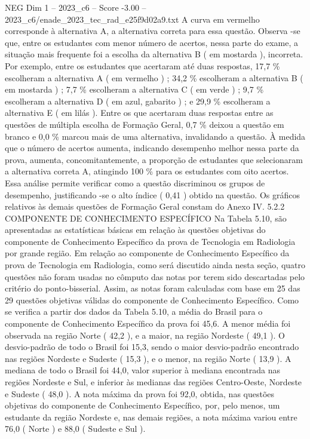 \begin{textsample}{NEG Dim 1 – 2023\_c6 – Score -3.00 – 2023\_c6/enade\_2023\_tec\_rad\_e25f9d02a9.txt}
A curva em vermelho corresponde à alternativa A, a alternativa correta para essa questão.
Observa -se que, entre os estudantes com menor número de acertos, nessa parte do exame, a situação mais frequente foi a escolha da alternativa B ( em mostarda ), incorreta.
Por exemplo, entre os estudantes que acertaram até duas respostas, 17,7 \% escolheram a alternativa A ( em vermelho ) ; 34,2 \% escolheram a alternativa B ( em mostarda ) ; 7,7 \% escolheram a alternativa C ( em verde ) ; 9,7 \% escolheram a alternativa D ( em azul, gabarito ) ; e 29,9 \% escolheram a alternativa E ( em lilás ).
Entre os que acertaram duas respostas entre as questões de múltipla escolha de Formação Geral, 0,7 \% deixou a questão em branco e 0,0 \% marcou mais de uma alternativa, invalidando a questão.
À medida que o número de acertos aumenta, indicando desempenho melhor nessa parte da prova, aumenta, concomitantemente, a proporção de estudantes que selecionaram a alternativa correta A, atingindo 100 \% para os estudantes com oito acertos.
Essa análise permite verificar como a questão discriminou os grupos de desempenho, justificando -se o alto índice ( 0,41 ) obtido na questão.
Os gráficos relativos às demais questões de Formação Geral constam do Anexo IV. 5.2.2 COMPONENTE DE CONHECIMENTO ESPECÍFICO Na Tabela 5.10, são apresentadas as estatísticas básicas em relação às questões objetivas do componente de Conhecimento Específico da prova de Tecnologia em Radiologia por grande região.
Em relação ao componente de Conhecimento Específico da prova de Tecnologia em Radiologia, como será discutido ainda nesta seção, quatro questões não foram usadas no cômputo das notas por terem sido descartadas pelo critério do ponto-bisserial.
Assim, as notas foram calculadas com base em 25 das 29 questões objetivas válidas do componente de Conhecimento Específico.
Como se verifica a partir dos dados da Tabela 5.10, a média do Brasil para o componente de Conhecimento Específico da prova foi 45,6.
A menor média foi observada na região Norte ( 42,2 ), e a maior, na região Nordeste ( 49,1 ).
O desvio-padrão de todo o Brasil foi 15,3, sendo o maior desvio-padrão encontrado nas regiões Nordeste e Sudeste ( 15,3 ), e o menor, na região Norte ( 13,9 ).
A mediana de todo o Brasil foi 44,0, valor superior à mediana encontrada nas regiões Nordeste e Sul, e inferior às medianas das regiões Centro-Oeste, Nordeste e Sudeste ( 48,0 ).
A nota máxima da prova foi 92,0, obtida, nas questões objetivas do componente de Conhecimento Específico, por, pelo menos, um estudante da região Nordeste e, nas demais regiões, a nota máxima variou entre 76,0 ( Norte ) e 88,0 ( Sudeste e Sul ).

\end{textsample}
